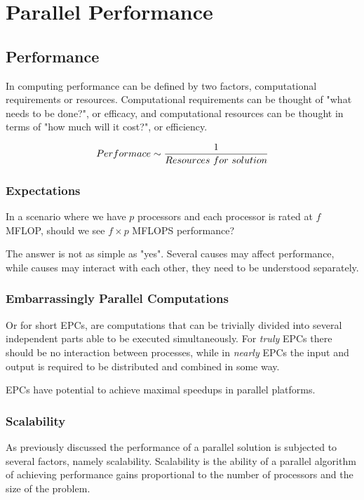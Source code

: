 \chapter{Parallel Performance}

\section{Performance}

In computing performance can be defined by two factors,
computational requirements or resources.
Computational requirements can be thought of "what needs to be done?", or efficacy,
and computational resources can be thought in terms of "how much will it cost?", or efficiency.

\begin{equation}
    \mathnormal{Performace} \sim \frac{1}{\mathnormal{Resources~for~solution}}
\end{equation}

\subsection{Expectations}

In a scenario where we have $p$ processors and each processor is rated at $f$ MFLOP, should we see $f \times p$ MFLOPS performance?

The answer is not as simple as "yes".
Several causes may affect performance, while causes may interact with each other,
they need to be understood separately.

\subsection{Embarrassingly Parallel Computations}

Or for short EPCs, are computations that can be trivially divided into several independent parts able to be executed simultaneously.
For \textit{truly} EPCs there should be no interaction between processes, while in \textit{nearly} EPCs the input and output is required to be distributed and combined in some way.

EPCs have potential to achieve maximal speedups in parallel platforms.

\subsection{Scalability}


As previously discussed the performance of a parallel solution is subjected to several factors, namely scalability.
Scalability is the ability of a parallel algorithm of achieving performance gains proportional to the number of processors and the size of the problem.

